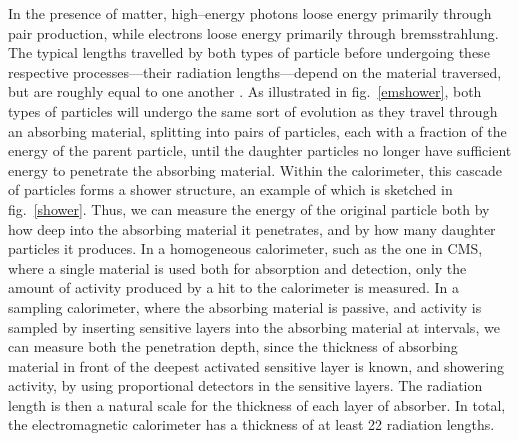 In the presence of matter, high--energy photons loose energy primarily through pair production, while electrons loose energy primarily through bremsstrahlung. The typical lengths travelled by both types of particle before undergoing these respective processes---their radiation lengths---depend on the material traversed, but are roughly equal to one another \cite{fernow:sampcal}. As illustrated in fig.~\ref{emshower}, both types of particles will undergo the same sort of evolution as they travel through an absorbing material, splitting into pairs of particles, each with a fraction of the energy of the parent particle, until the daughter particles no longer have sufficient energy to penetrate the absorbing material. Within the calorimeter, this cascade of particles forms a shower structure, an example of which is sketched in fig.~\ref{shower}. Thus, we can measure the energy of the original particle both by how deep into the absorbing material it penetrates, and by how many daughter particles it produces. In a homogeneous calorimeter, such as the one in CMS, where a single material is used both for absorption and detection, only the amount of activity produced by a hit to the calorimeter is measured. In a sampling calorimeter, where the absorbing material is passive, and activity is sampled by inserting sensitive layers into the absorbing material at intervals, we can measure both the penetration depth, since the thickness of absorbing material in front of the deepest activated sensitive layer is known, and showering activity, by using proportional detectors in the sensitive layers. The radiation length is then a natural scale for the thickness of each layer of absorber. In total, the electromagnetic calorimeter has a thickness of at least 22 radiation lengths.


